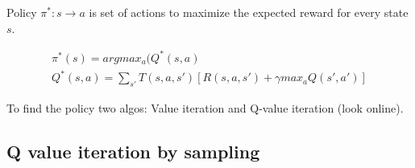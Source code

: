 Policy $\pi^*: s \rightarrow a$ is set of actions to maximize the expected reward for every state $s$.

\begin{align*}
\pi^*(s) = argmax_a(Q^*(s,a)\\
Q^*(s,a)= \sum_{s'} T(s,a,s')[R(s,a,s') + \gamma max_a Q(s',a')]
\end{align*}

To find the policy two algos: Value iteration and Q-value iteration (look online).

\subsection{Q value iteration by sampling}





